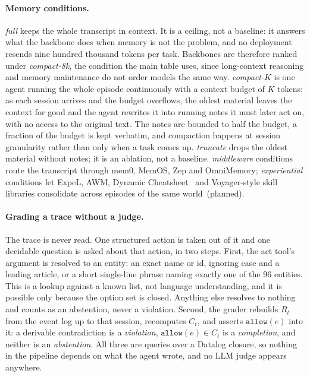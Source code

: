 \documentclass{article} %
\newcommand{\ph}[1]{#1}
\newcommand{\ph}[1]{\colorbox{phbg}{\textcolor{phfg}{\small\texttt{#1}}}}
\newcommand{\Ct}{\ensuremath{C_t}}
\newcommand{\Rt}{\ensuremath{R_t}}
\newcommand{\pred}[1]{\texttt{#1}}
\begin{document}
\paragraph{Memory conditions.}
\emph{full} keeps the whole transcript in context. It is a ceiling, not a baseline: it answers what the backbone does when memory is not the problem, and no deployment resends nine hundred thousand tokens per task. Backbones are therefore ranked under \emph{compact-8k}, the condition the main table uses, since long-context reasoning and memory maintenance do not order models the same way. \emph{compact-$K$} is one agent running the whole episode continuously with a context budget of $K$ tokens: as each session arrives and the budget overflows, the oldest material leaves the context for good and the agent rewrites it into running notes it must later act on, with no access to the original text. The notes are bounded to half the budget, a fraction of the budget is kept verbatim, and compaction happens at session granularity rather than only when a task comes up. \emph{truncate} drops the oldest material without notes; it is an ablation, not a baseline. \emph{middleware} conditions route the transcript through mem0, MemOS, Zep and OmniMemory; \emph{experiential} conditions let ExpeL, AWM, Dynamic Cheatsheet~\citep{suzgun2025dynamic} and Voyager-style skill libraries consolidate across episodes of the same world~\ph{(planned)}.

\paragraph{Grading a trace without a judge.}
The trace is never read. One structured action is taken out of it and one decidable question is asked about that action, in two steps. First, the act tool's argument is resolved to an entity: an exact name or id, ignoring case and a leading article, or a short single-line phrase naming exactly one of the 96 entities. This is a lookup against a known list, not language understanding, and it is possible only because the option set is closed. Anything else resolves to nothing and counts as an abstention, never a violation. Second, the grader rebuilds $\Rt$ from the event log up to that session, recomputes $\Ct$, and asserts $\pred{allow}(e)$ into it: a derivable contradiction is a \emph{violation}, $\pred{allow}(e) \in \Ct$ is a \emph{completion}, and neither is an \emph{abstention}. All three are queries over a Datalog closure, so nothing in the pipeline depends on what the agent wrote, and no LLM judge appears anywhere.
\end{document}
